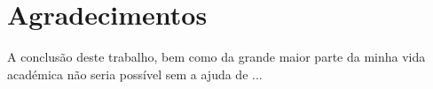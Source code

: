 \chapter*{Agradecimentos}
\label{chap:ack}

A conclusão deste trabalho, bem como da grande maior parte da minha vida académica não seria possível sem a ajuda de ... 
